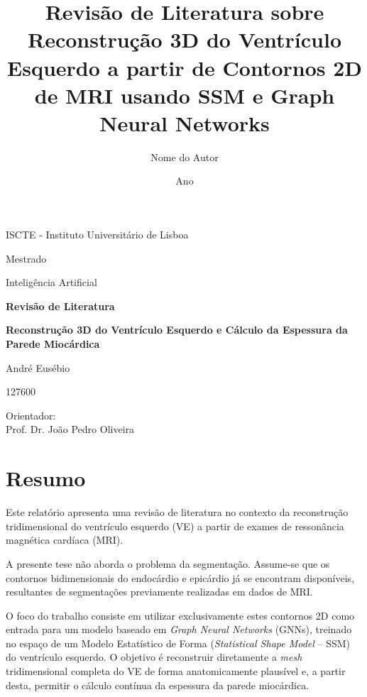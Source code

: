 \documentclass[12pt,a4paper]{report}
\title{Revisão de Literatura sobre \\ \textbf{Reconstrução 3D do Ventrículo Esquerdo a partir de Contornos 2D de MRI usando SSM e Graph Neural Networks}}
\author{Nome do Autor}
\date{Ano}
\begin{document}
\begin{titlepage}
\centering
\vspace*{3cm}

{\Large ISCTE - Instituto Universitário de Lisboa \par}
\vspace{1cm}

{\Large Mestrado \par}

{\Large Inteligência Artificial \par}
\vspace{3cm}

{\bfseries\Large Revisão de Literatura\par}
\vspace{1cm}

{\bfseries\Large Reconstrução 3D do Ventrículo Esquerdo e Cálculo da Espessura da Parede Miocárdica\par}
\vspace{3cm}

{\large André Eusébio\par}
{\large 127600\par}
\vfill

{\large Orientador: \\ Prof. Dr. João Pedro Oliveira\par}

\end{titlepage}

\chapter*{Resumo}

Este relatório apresenta uma revisão de literatura no contexto da reconstrução tridimensional do ventrículo esquerdo (VE) a partir de exames de ressonância magnética cardíaca (MRI).

A presente tese não aborda o problema da segmentação. Assume-se que os contornos bidimensionais do endocárdio e epicárdio já se encontram disponíveis, resultantes de segmentações previamente realizadas em dados de MRI.

O foco do trabalho consiste em utilizar exclusivamente estes contornos 2D como entrada para um modelo baseado em \textit{Graph Neural Networks} (GNNs), treinado no espaço de um Modelo Estatístico de Forma (\textit{Statistical Shape Model} – SSM) do ventrículo esquerdo. O objetivo é reconstruir diretamente a \textit{mesh} tridimensional completa do VE de forma anatomicamente plausível e, a partir desta, permitir o cálculo contínua da espessura da parede miocárdica.
\end{document}
